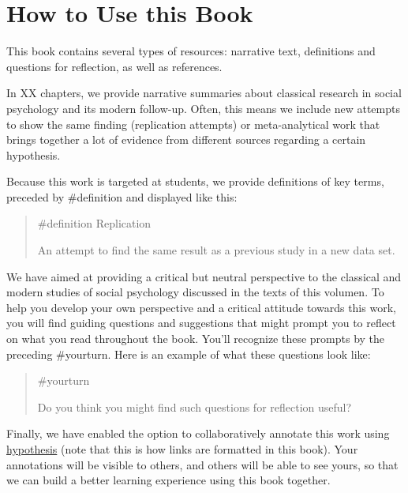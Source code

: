 \documentclass[
  letterpaper,
]{book}
\begin{document}

\chapter*{\texorpdfstring{{How to Use this
Book}}{How to Use this Book}}\label{how-to-use-this-book}


This book contains several types of resources: narrative text,
definitions and questions for reflection, as well as references.

In XX chapters, we provide narrative summaries about classical research
in social psychology and its modern follow-up. Often, this means we
include new attempts to show the same finding (replication attempts) or
meta-analytical work that brings together a lot of evidence from
different sources regarding a certain hypothesis.

Because this work is targeted at students, we provide definitions of key
terms, preceded by {\#definition} and displayed like this:

\begin{quote}
{\#definition} Replication

An attempt to find the same result as a previous study in a new data
set.
\end{quote}

We have aimed at providing a critical but neutral perspective to the
classical and modern studies of social psychology discussed in the texts
of this volumen. To help you develop your own perspective and a critical
attitude towards this work, you will find guiding questions and
suggestions that might prompt you to reflect on what you read throughout
the book. You'll recognize these prompts by the preceding {\#yourturn.}
Here is an example of what these questions look like:

\begin{quote}
{\#yourturn}

Do you think you might find such questions for reflection useful?
\end{quote}

Finally, we have enabled the option to collaboratively annotate this
work using \href{https://web.hypothes.is/}{hypothesis} (note that this
is how links are formatted in this book). Your annotations will be
visible to others, and others will be able to see yours, so that we can
build a better learning experience using this book together.
\end{document}
